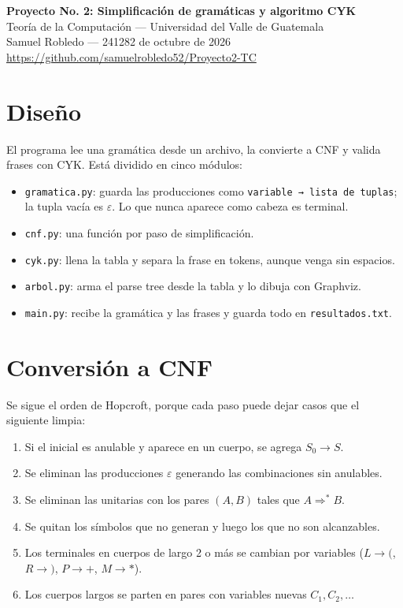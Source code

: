 \documentclass[11pt,letterpaper]{article}
\newcommand{\g}[1]{\texttt{#1}}
\begin{document}
\begin{center}
{\Large\bfseries Proyecto No. 2: Simplificación de gramáticas y algoritmo CYK}\\[0.4em]
Teoría de la Computación — Universidad del Valle de Guatemala\\[0.3em]
Samuel Robledo — 241282  de octubre de 2026\\[0.2em]
\url{https://github.com/samuelrobledo52/Proyecto2-TC}
\end{center}

\section{Diseño}

El programa lee una gramática desde un archivo, la convierte a CNF y valida frases con CYK. Está dividido en cinco módulos:

\begin{itemize}
\item \g{gramatica.py}: guarda las producciones como \g{variable → lista de tuplas}; la tupla vacía es $\varepsilon$. Lo que nunca aparece como cabeza es terminal.
\item \g{cnf.py}: una función por paso de simplificación.
\item \g{cyk.py}: llena la tabla y separa la frase en tokens, aunque venga sin espacios.
\item \g{arbol.py}: arma el parse tree desde la tabla y lo dibuja con Graphviz.
\item \g{main.py}: recibe la gramática y las frases y guarda todo en \g{resultados.txt}.
\end{itemize}

\section{Conversión a CNF}

Se sigue el orden de Hopcroft, porque cada paso puede dejar casos que el siguiente limpia:

\begin{enumerate}
\item Si el inicial es anulable y aparece en un cuerpo, se agrega $S_0\to S$.
\item Se eliminan las producciones $\varepsilon$ generando las combinaciones sin anulables.
\item Se eliminan las unitarias con los pares $(A,B)$ tales que $A\Rightarrow^* B$.
\item Se quitan los símbolos que no generan y luego los que no son alcanzables.
\item Los terminales en cuerpos de largo 2 o más se cambian por variables ($L\to($, $R\to)$, $P\to+$, $M\to*$).
\item Los cuerpos largos se parten en pares con variables nuevas $C_1, C_2, \dots$
\end{enumerate}
\end{document}
